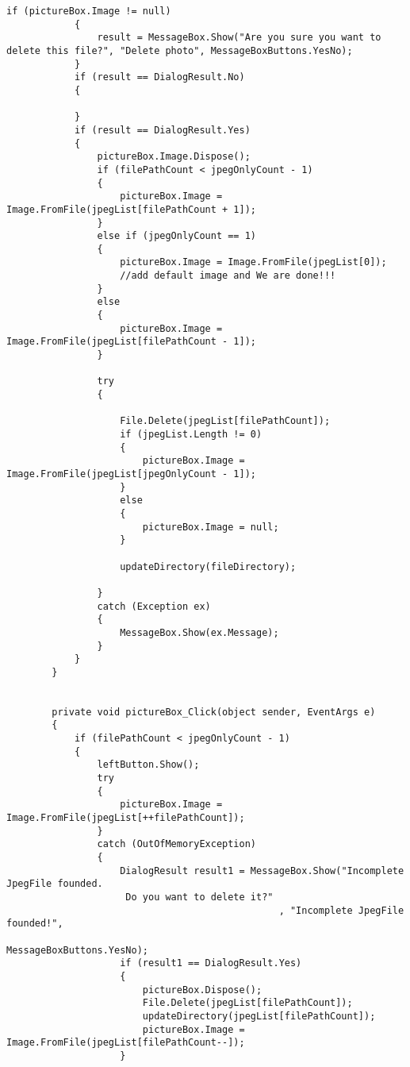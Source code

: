 \begin{lstlisting}[caption=Main Form of GUI, label=appen:main_form]
            if (pictureBox.Image != null)
            {
                result = MessageBox.Show("Are you sure you want to delete this file?", "Delete photo", MessageBoxButtons.YesNo);
            }
            if (result == DialogResult.No)
            {

            }
            if (result == DialogResult.Yes)
            {
                pictureBox.Image.Dispose();
                if (filePathCount < jpegOnlyCount - 1)
                {
                    pictureBox.Image = Image.FromFile(jpegList[filePathCount + 1]);
                }
                else if (jpegOnlyCount == 1)
                {
                    pictureBox.Image = Image.FromFile(jpegList[0]);
                    //add default image and We are done!!!
                }
                else
                {
                    pictureBox.Image = Image.FromFile(jpegList[filePathCount - 1]);
                }

                try
                {

                    File.Delete(jpegList[filePathCount]);
                    if (jpegList.Length != 0)
                    {
                        pictureBox.Image = Image.FromFile(jpegList[jpegOnlyCount - 1]);
                    }
                    else
                    {
                        pictureBox.Image = null;
                    }

                    updateDirectory(fileDirectory);

                }
                catch (Exception ex)
                {
                    MessageBox.Show(ex.Message);
                }
            }
        }


        private void pictureBox_Click(object sender, EventArgs e)
        {
            if (filePathCount < jpegOnlyCount - 1)
            {
                leftButton.Show();
                try
                {
                    pictureBox.Image = Image.FromFile(jpegList[++filePathCount]);
                }
                catch (OutOfMemoryException)
                {
                    DialogResult result1 = MessageBox.Show("Incomplete JpegFile founded.
                     Do you want to delete it?"
                                                , "Incomplete JpegFile founded!",
                                                 MessageBoxButtons.YesNo);
                    if (result1 == DialogResult.Yes)
                    {
                        pictureBox.Dispose();
                        File.Delete(jpegList[filePathCount]);
                        updateDirectory(jpegList[filePathCount]);
                        pictureBox.Image = Image.FromFile(jpegList[filePathCount--]);
                    }
                    

\end{lstlisting}
